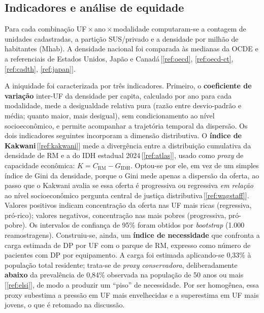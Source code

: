\documentclass[12pt,a4paper,oneside]{article}
\begin{document}
\subsection{Indicadores e análise de equidade}

Para cada combinação UF\,$\times$\,ano\,$\times$\,modalidade
computaram-se a contagem de unidades cadastradas, a partição
SUS/privado e a densidade por milhão de habitantes (Mhab). A densidade
nacional foi comparada às medianas da OCDE e a referenciais de Estados
Unidos, Japão e Canadá\,[\ref{ref:oecd}, \ref{ref:oecd-ct},
\ref{ref:cadth}, \ref{ref:japan}].

A iniquidade foi caracterizada por três indicadores. Primeiro, o
\textbf{coeficiente de variação} inter-UF da densidade per capita,
calculado por ano para cada modalidade, mede a desigualdade relativa
pura (razão entre desvio-padrão e média; quanto maior, mais desigual),
sem condicionamento ao nível socioeconômico, e permite acompanhar a
trajetória temporal da dispersão. Os dois indicadores seguintes
incorporam a dimensão distributiva. O \textbf{índice de
Kakwani}\,[\ref{ref:kakwani}] mede a divergência entre a
distribuição cumulativa da densidade de RM e a do IDH estadual
2024\,[\ref{ref:atlas}], usado como \textit{proxy} de capacidade
econômica: $K = C_{\text{RM}} - G_{\text{IDH}}$. Optou-se por ele, em
vez de um simples índice de Gini da densidade, porque o Gini mede
apenas a dispersão da oferta, ao passo que o Kakwani avalia se essa
oferta é progressiva ou regressiva \textit{em relação} ao nível
socioeconômico \textemdash{} pergunta central de justiça
distributiva\,[\ref{ref:wagstaff}]. Valores positivos indicam
concentração da oferta nas UF mais ricas (regressiva, pró-rico);
valores negativos, concentração nas mais pobres (progressiva,
pró-pobre). Os intervalos de confiança de 95\% foram obtidos por
\textit{bootstrap} (1.000 reamostragens). Construiu-se, ainda, um
\textbf{índice de necessidade} que confronta a carga estimada de DP
por UF com o parque de RM, expresso como número de pacientes com DP
por equipamento. A carga foi estimada aplicando-se 0,33\% à população
total residente; trata-se de \textit{proxy conservadora}, deliberadamente
\textbf{abaixo} da prevalência de 0,84\% observada na população de 50
anos ou mais\,[\ref{ref:elsi}], de modo a produzir um ``piso'' de
necessidade. Por ser homogênea, essa proxy subestima a pressão em UF
mais envelhecidas e a superestima em UF mais jovens, o que é retomado
na discussão.

\end{document}
